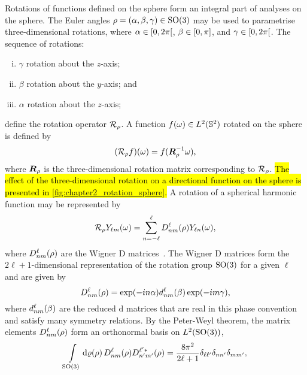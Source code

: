 Rotations of functions defined on the sphere form an integral part of analyses on the sphere.
The Euler angles \(\rho=(\alpha,\beta,\gamma) \in \rotationGroup{}\) may be used to parametrise three-dimensional rotations, where \(\alpha \in \interval[open right]{0}{2\pi}\), \(\beta \in \interval{0}{\pi}\), and \(\gamma \in \interval[open right]{0}{2\pi}\).
The sequence of rotations:
%
\begin{enumerate}[(i),nosep,left=\parindent]
	\item \({\gamma}\) rotation about the \(z\)-axis;
	\item \({\beta}\) rotation about the \(y\)-axis; and
	\item \({\alpha}\) rotation about the \(z\)-axis;
\end{enumerate}
%
define the rotation operator \(\rotation{\rho}\).
A function \(\pixel{f} \in \hilbert{\twoSphere}\) rotated on the sphere is defined by
%
\begin{equation}\label{eq:chapter2_rotation_matrix}
	\pixel{(\rotation{\rho}f)}
	= f(\rotationMatrix^{-1} \omega),
\end{equation}
%
where \(\rotationMatrix{}\) is the three-dimensional rotation matrix corresponding to \(\rotation{\rho}\).
\hl{The effect of the three-dimensional rotation on a directional function on the sphere is presented in \mbox{\cref{fig:chapter2_rotation_sphere}}.}
A rotation of a spherical harmonic function may be represented by
%
\begin{equation}\label{eq:chapter2_rotate_spherical_harmonics}
	\rotation{\rho} \pixel{\harmonic{Y}}
	= \wignerSum \wigner{\ell}{n}{m}(\rho) \pixel{Y_{\ell n}},
\end{equation}
%
where \(\wigner{\ell}{n}{m}(\rho)\) are the Wigner D matrices~\cite{Brink1993,Ritchie1999}.
The Wigner D matrices form the \(2\ell+1\)-dimensional representation of the rotation group \(\rotationGroup{}\) for a given \(\ell{}\) and are given by
%
\begin{equation}
	\wigner{\ell}{n}{m}(\rho)
	= \exp(-i n\alpha) \reducedWigner{\ell}{n}{m}(\beta) \exp(-i m\gamma),
\end{equation}
%
where \(\reducedWigner{\ell}{n}{m}(\beta)\) are the reduced d matrices that are real in this phase convention and satisfy many symmetry relations.
By the Peter-Weyl theorem, the matrix elements \(\wigner{\ell}{n}{m}(\rho)\) form an orthonormal basis on \(\hilbert{\rotationGroup}\), \ie{}
%
\begin{equation}
	\integrateRotation{\rho} \wigner{\ell}{n}{m}(\rho) \wigner[\ast]{\ell'}{n'}{m'}(\rho)
	= \frac{8\pi^{2}}{2\ell+1} \delta_{\ell\ell'} \delta_{n n'} \delta_{mm'},
\end{equation}
